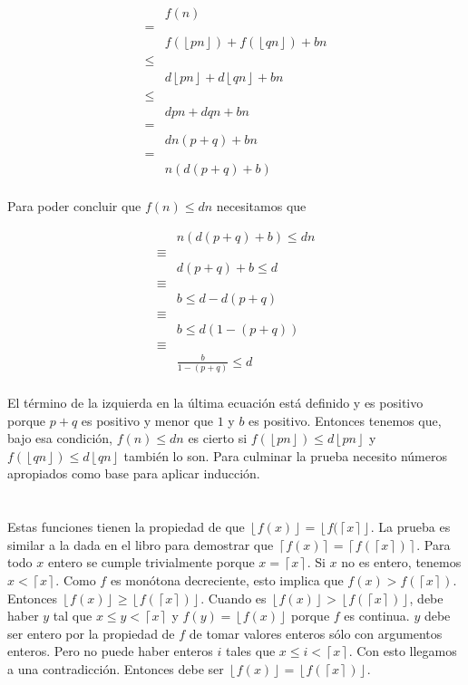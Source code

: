 \documentclass{article}
\newcommand{\piso}[1]{\left \lfloor #1 \right \rfloor}
\newcommand{\techo}[1]{\left \lceil #1 \right \rceil}
\begin{document}
\begin{align*}
 & f(n) \\
 = & \\
 & f(\piso{pn}) + f(\piso{qn}) + bn \\
 \leq & \\
 & d\piso{pn} + d\piso{qn} + bn \\
 \leq & \\
 & dpn + dqn + bn \\
 = & \\
 & dn(p+q) + bn \\
 = & \\
 & n(d(p+q) + b) \\
\end{align*}

Para poder concluir que $f(n) \leq dn$ necesitamos que

\begin{align*}
 & n(d(p+q) + b) \leq dn \\
 \equiv & \\
 & d(p+q) + b \leq d \\
 \equiv & \\
 & b \leq d - d(p+q) \\
 \equiv & \\
 & b \leq d(1 - (p+q)) \\
 \equiv & \\
 & \frac{b}{1-(p+q)} \leq d \\
\end{align*}

El término de la izquierda en la última ecuación está definido y es positivo
porque $p+q$ es positivo y menor que $1$ y $b$ es positivo. Entonces tenemos
que, bajo esa condición, $f(n) \leq dn$ es cierto si
$f(\piso{pn}) \leq d\piso{pn}$ y $f(\piso{qn}) \leq d\piso{qn}$ también lo son.
Para culminar la prueba necesito números apropiados como base para aplicar
inducción.

\section{}

Estas funciones tienen la propiedad de que $\piso{f(x)} = \piso{f(\techo{x}}$.
La prueba es similar a la dada en el libro para demostrar que
$\techo{f(x)} = \techo{f(\techo{x})}$.
Para todo $x$ entero se cumple trivialmente porque $x = \techo{x}$. Si $x$ no
es entero, tenemos $x < \techo{x}$. Como $f$ es monótona decreciente, esto
implica que $f(x) > f(\techo{x})$. Entonces
$\piso{f(x)} \geq \piso{f(\techo{x})}$.
Cuando es $\piso{f(x)} > \piso{f(\techo{x})}$, debe haber $y$ tal que
$x \leq y < \techo{x}$ y $f(y) = \piso{f(x)}$ porque $f$ es continua.
$y$ debe
ser entero por la propiedad
de $f$ de tomar valores enteros sólo con argumentos enteros.
Pero no puede haber enteros $i$ tales que $x \leq i < \techo{x}$. 
Con esto llegamos
a una contradicción.
Entonces debe ser $\piso{f(x)} = \piso{f(\techo{x})}$.
\end{document}

